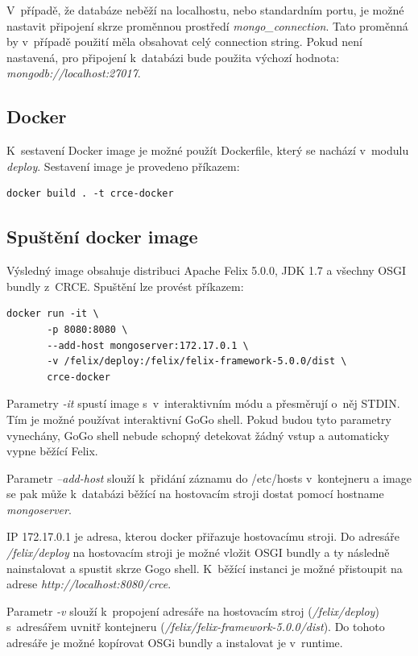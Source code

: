 \documentclass[12pt, a4paper]{article}
\begin{document}
V~případě, že databáze neběží na localhostu, nebo standardním portu, je možné nastavit připojení skrze proměnnou prostředí \textit{mongo\_connection}. Tato proměnná by v~případě použití měla obsahovat celý connection string. Pokud není nastavená, pro připojení k~databázi bude použita výchozí hodnota: \textit{mongodb://localhost:27017}.

\subsection{Docker}
K~sestavení Docker image je možné použít Dockerfile, který se nachází v~modulu \textit{deploy}. Sestavení image je provedeno příkazem:

\begin{verbatim}
docker build . -t crce-docker
\end{verbatim} 

\subsection{Spuštění docker image}

Výsledný image obsahuje distribuci Apache Felix 5.0.0, JDK 1.7 a všechny OSGI bundly z~CRCE. Spuštění lze provést příkazem:

\begin{verbatim}
docker run -it \ 
	   -p 8080:8080 \
	   --add-host mongoserver:172.17.0.1 \
	   -v /felix/deploy:/felix/felix-framework-5.0.0/dist \
	   crce-docker 
\end{verbatim}

Parametry \textit{-it} spustí image s~v~interaktivním módu a přesměrují o~něj STDIN. Tím je možné používat interaktivní GoGo shell. Pokud budou tyto parametry vynechány, GoGo shell nebude schopný detekovat žádný vstup a automaticky vypne běžící Felix.

Parametr \textit{--add-host} slouží k~přidání záznamu do /etc/hosts v~kontejneru a image se pak může k~databázi běžící na hostovacím stroji dostat pomocí hostname \textit{mongoserver}. 

IP 172.17.0.1 je adresa, kterou docker přiřazuje hostovacímu stroji. Do adresáře \textit{/felix/deploy} na hostovacím stroji je možné vložit OSGI bundly a ty následně nainstalovat a spustit skrze Gogo shell. K~běžící instanci je možné přistoupit na adrese \textit{http://localhost:8080/crce}. 

Parametr \textit{-v} slouží k~propojení adresáře na hostovacím stroj (\textit{/felix/deploy}) s~adresářem uvnitř kontejneru (\textit{/felix/felix-framework-5.0.0/dist}). Do tohoto adresáře je možné kopírovat OSGi bundly a instalovat je v~runtime.
\end{document}
